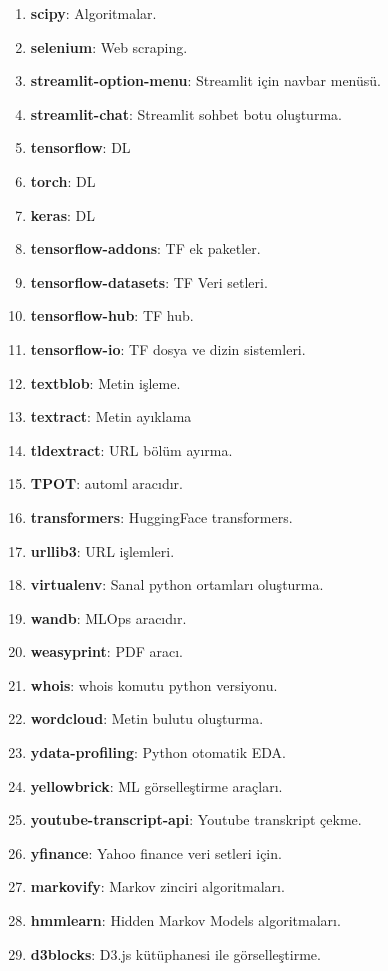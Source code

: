 \begin{enumerate}
    \item \textbf{scipy}: Algoritmalar.
    \item \textbf{selenium}: Web scraping.
    \item \textbf{streamlit-option-menu}: Streamlit için navbar menüsü.
    \item \textbf{streamlit-chat}: Streamlit sohbet botu oluşturma.
    \item \textbf{tensorflow}: DL
    \item \textbf{torch}: DL
    \item \textbf{keras}: DL
    \item \textbf{tensorflow-addons}: TF ek paketler.
    \item \textbf{tensorflow-datasets}: TF Veri setleri.
    \item \textbf{tensorflow-hub}: TF hub.
    \item \textbf{tensorflow-io}: TF dosya ve dizin sistemleri.
    \item \textbf{textblob}: Metin işleme.
    \item \textbf{textract}: Metin ayıklama
    \item \textbf{tldextract}: URL bölüm ayırma.
    \item \textbf{TPOT}: automl aracıdır.
    \item \textbf{transformers}: HuggingFace transformers.
    \item \textbf{urllib3}: URL işlemleri.
    \item \textbf{virtualenv}: Sanal python ortamları oluşturma.
    \item \textbf{wandb}: MLOps aracıdır.
    \item \textbf{weasyprint}: PDF aracı.
    \item \textbf{whois}: whois komutu python versiyonu.
    \item \textbf{wordcloud}: Metin bulutu oluşturma.
    \item \textbf{ydata-profiling}: Python otomatik EDA.
    \item \textbf{yellowbrick}: ML görselleştirme araçları.
    \item \textbf{youtube-transcript-api}: Youtube transkript çekme.
    \item \textbf{yfinance}: Yahoo finance veri setleri için.
    \item \textbf{markovify}: Markov zinciri algoritmaları.
    \item \textbf{hmmlearn}: Hidden Markov Models algoritmaları.
    \item \textbf{d3blocks}: D3.js kütüphanesi ile görselleştirme.

\end{enumerate}
